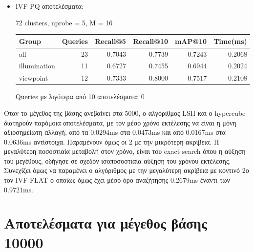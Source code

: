 \documentclass [conference]{IEEEtran}
\begin{document}
\begin{itemize}
    \item IVF PQ αποτελέσματα:
    \begin{table}[H]
    \centering
    \small
    \setlength{\tabcolsep}{3pt}
    72 clusters, nprobe = 5, Μ = 16
    \par\smallskip
    \begin{tabular}{l r r r r r}
    \hline
    \textbf{Group} & \textbf{Queries} & \textbf{Recall@5} & \textbf{Recall@10} & \textbf{mAP@10} & \textbf{Time(ms)} \\
    \hline
    all & 23 & 0.7043 & 0.7739 & 0.7243 & 0.2068 \\
    illumination & 11 & 0.6727 & 0.7455 & 0.6944 & 0.2024 \\
    viewpoint & 12 & 0.7333 & 0.8000 & 0.7517 & 0.2108 \\
    \hline
    \end{tabular}
    \par\smallskip
    \footnotesize Queries με λιγότερα από 10 αποτελέσματα: 0
    \end{table}

    
\end{itemize}

Όταν το μέγεθος της βάσης ανεβαίνει στα 5000, ο αλγόριθμος LSH και ο hypercube διατηρούν παρόμοια αποτελέσματα, με τον μέσο χρόνο εκτέλεσης να είναι η μόνη αξιοσημείωτη αλλαγή, από τα 0.0294ms στα 0.0473ms και από 0.0167ms στα 0.0636ms αντίστοιχα. Παραμένουν όμως οι 2 με την μικρότερη ακρίβεια. Η μεγαλύτερη ποσοστιαία μεταβολή στον χρόνο, είναι του exact search όπου η αύξηση του μεγέθους, οδήγησε σε σχεδόν ισοποσοστιαία αύξηση του χρόνου εκτέλεσης. Συνεχίζει όμως να παραμένει ο αλγόριθμος με την μεγαλύτερη ακρίβεια με κοντινό 2ο τον IVF FLAT ο οποίως όμως έχει μέσο όρο αναζήτησης 0.2679ms έναντι των 0.9721ms.

\section{Αποτελέσματα για μέγεθος βάσης 10000}
\end{document}
